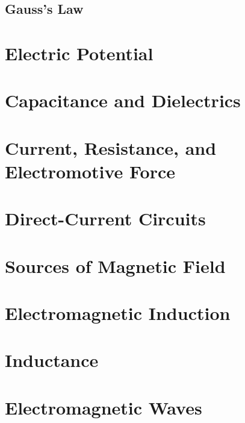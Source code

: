 \documentclass[11pt, letterpaper, titlepage]{report}
\title{\textbf{\Huge{ \begin{center}
Physics 230 Notes\\ %
\end{center} }}}
\author{ Lora Ma and Benjamin Kong\\}
\begin{document}
\maketitle

\maketitle %
{
  \hypersetup{}
  \parskip 0pt
  \tableofcontents
} %
\newpage
{}
\pagestyle{mypagestyle}



\section{Gauss's Law}



\chapter{Electric Potential}
\chapter{Capacitance and Dielectrics}
\chapter{Current, Resistance, and Electromotive Force}
\chapter{Direct-Current Circuits}





\chapter{Sources of Magnetic Field}
\chapter{Electromagnetic Induction}
\chapter{Inductance}
\chapter{Electromagnetic Waves}
\end{document}

